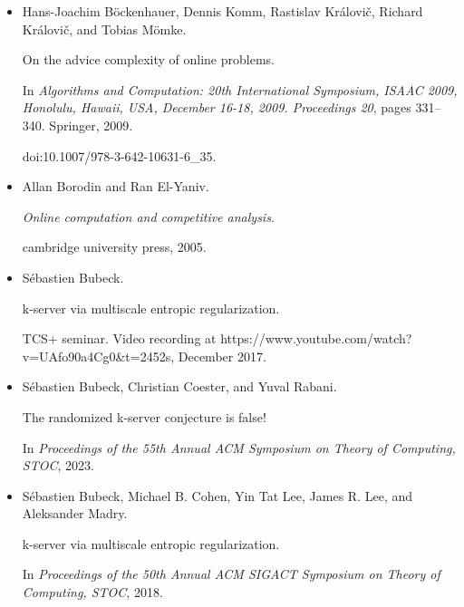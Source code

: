 \begin{itemize}
\item[] 
[11]

Hans-Joachim Böckenhauer, Dennis Komm, Rastislav Královič,
Richard Královič, and Tobias Mömke.


On the advice complexity of online problems.


In \emph{Algorithms and Computation: 20th International Symposium,
ISAAC 2009, Honolulu, Hawaii, USA, December 16-18, 2009. Proceedings 20},
pages 331–340. Springer, 2009.


doi:10.1007/978-3-642-10631-6\_35.





\item[] 
[12]

Allan Borodin and Ran El-Yaniv.


\emph{Online computation and competitive analysis}.


cambridge university press, 2005.





\item[] 
[13]

Sébastien Bubeck.


k-server via multiscale entropic regularization.


TCS+ seminar. Video recording at
https://www.youtube.com/watch?v=UAfo90a4Cg0\&t=2452s, December 2017.





\item[] 
[14]

Sébastien Bubeck, Christian Coester, and Yuval Rabani.


The randomized k-server conjecture is false!


In \emph{Proceedings of the 55th Annual ACM Symposium on Theory of
Computing, STOC}, 2023.





\item[] 
[15]

Sébastien Bubeck, Michael B. Cohen, Yin Tat Lee, James R. Lee, and
Aleksander Madry.


k-server via multiscale entropic regularization.


In \emph{Proceedings of the 50th Annual ACM SIGACT Symposium on
Theory of Computing, STOC}, 2018.






\end{itemize}
